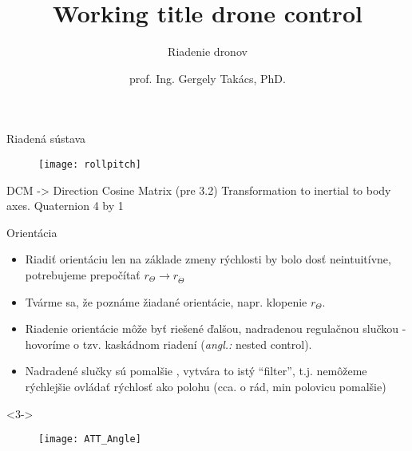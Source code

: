 \documentclass{beamer}
\title[Riadiace Algoritmy Dronov]
{Working title drone control}
\subtitle{\vspace{1em}Riadenie dronov}
\author[]{prof. Ing. Gergely Takács, PhD.}
\date[07.12.2021]{}
\newcommand{\angl}[1]{{\color{gray}(\emph{angl.:} #1)}}
\begin{document}



%

\begin{frame}{Riadená sústava}
\begin{figure}
\centering
  \texttt{[image: rollpitch]}\\
\end{figure}
\end{frame}



%


\begin{frame}
DCM -> Direction Cosine Matrix (pre 3.2) 
Transformation to inertial to body axes.
Quaternion 4 by 1
\end{frame}


\begin{frame}[t]{Orientácia}
\begin{itemize}
  \item<1-> Riadiť orientáciu len na základe zmeny rýchlosti by bolo dosť neintuitívne, potrebujeme prepočítať $r_{\Theta} \rightarrow r_{\dot{\Theta}}$
  \item<2-> Tvárme sa, že poznáme žiadané orientácie, napr. klopenie $r_{\Theta}$.
  \item<3-> Riadenie orientácie môže byť riešené ďalšou, nadradenou regulačnou slučkou - hovoríme o tzv. kaskádnom riadení \angl{nested control}.
  \item<4-> Nadradené slučky sú pomalšie \citep{AP:PID}, vytvára to istý ``filter'', t.j. nemôžeme rýchlejšie ovládať rýchlosť ako polohu (cca. o rád, min polovicu pomalšie)
  \end{itemize}

  \begin{onlyenv}<3->
  \begin{figure}
\centering
  \texttt{[image: ATT\_Angle]}\\
\end{figure}
\end{onlyenv}

  \end{frame}
\end{document}

